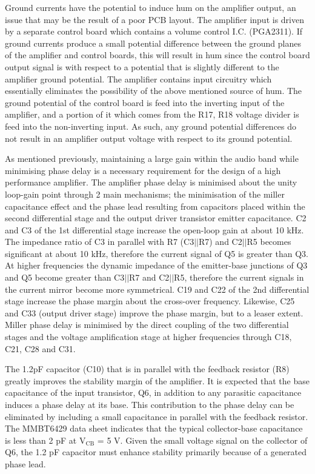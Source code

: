 \documentclass[a4paper,10pt, oneside]{article}
\begin{document}
Ground currents have the potential to induce hum on the amplifier output, an issue that may be the result of a poor PCB layout. The amplifier input is driven by a separate control board which contains a volume control I.C. (PGA2311). If ground currents produce 
a small potential difference between the ground planes of the amplifier and control boards, this will result in hum since the control board output signal is with respect to a potential that is slightly different to the amplifier ground potential. 
The amplifier contains input circuitry which essentially eliminates the possibility of the above mentioned source of hum. The ground potential of the control board is feed into the inverting input of the amplifier, and a portion of it which 
comes from the R17, R18 voltage divider is feed into the non-inverting input. As such, any ground potential differences do not result in an amplifier output voltage with respect to its ground potential. 

As mentioned previously, maintaining a large gain within the audio band while minimising phase delay is a necessary requirement for the design of a high performance amplifier. The amplifier phase delay is minimised about the unity loop-gain point through 2 main mechanisms; the minimisation of the miller capacitance effect and the phase lead resulting from capacitors placed within the second differential stage and the output driver transistor emitter capacitance. C2 and C3 of the 1st differential stage increase the open-loop gain at about 10 kHz. The impedance ratio of C3 in parallel with R7 (C3$||$R7) and C2$||$R5 becomes significant at about 10 kHz, therefore the current signal
of Q5 is greater than Q3. At higher frequencies the dynamic impedance of the emitter-base junctions of Q3 and Q5 become greater than C3$||$R7 and C2$||$R5, therefore the current signals in the current mirror become more symmetrical. C19 and C22 of the 2nd differential stage increase the phase margin about the cross-over frequency. Likewise, C25 and C33 (output driver stage) improve the phase margin, but to a leaser extent. Miller phase delay is minimised by the direct coupling of the two differential stages and the voltage amplification stage at higher frequencies through C18, C21, C28 and C31.

The 1.2pF capacitor (C10) that is in parallel with the feedback resistor (R8) greatly improves the stability margin of the amplifier. It is expected that the base capacitance of the input transistor, Q6, in addition to any parasitic capacitance induces a phase delay at its base. This contribution to the phase delay can be eliminated by including a small capacitance in parallel with the feedback resistor. The MMBT6429 data sheet indicates that the typical collector-base capacitance is less than 2 pF at V$_{\textrm{CB}}$ = 5 V. Given the small voltage signal on the collector of Q6, the 1.2 pF capacitor must enhance stability primarily because of a generated phase lead. 
\end{document}
